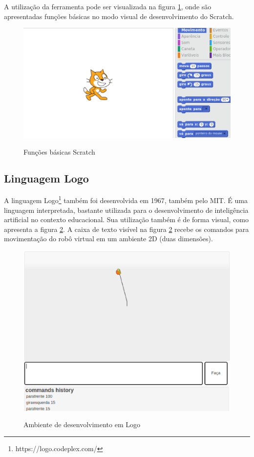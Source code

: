 		A utilização da ferramenta pode ser visualizada na figura \ref{img:funcoesBasicasScratch}, onde são apresentadas funções básicas no modo visual de desenvolvimento do Scratch.

		\begin{figure}[H]
			\centering
			\caption{Funções básicas Scratch}
			\includegraphics[scale=0.7]{figuras/funcoesBasicasSratch.eps}
			\label{img:funcoesBasicasScratch}
		\end{figure}

	\subsection{Linguagem Logo} %
	\label{sub:linguagem_logo}

		A linguagem Logo\footnote{https://logo.codeplex.com/} também foi desenvolvida em 1967, também pelo MIT. É uma linguagem interpretada, bastante utilizada para o desenvolvimento de inteligência artificial no contexto educacional. Sua utilização também é de forma visual, como apresenta a figura \ref{img:ambienteLogo}. A caixa de texto visível na figura \ref{img:ambienteLogo} recebe os comandos para movimentação do robô virtual em um ambiente 2D (duas dimensões).

		\begin{figure}[H]
			\centering
			\caption{Ambiente de desenvolvimento em Logo}
			\includegraphics[scale=0.7]{figuras/ambienteLogo.eps}
			\label{img:ambienteLogo}
		\end{figure}

